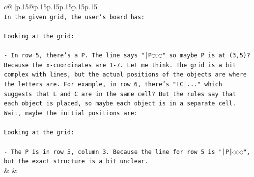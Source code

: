 \documentclass{article}
\begin{document}
{\begin{supertabular}{c@{$\;$}|p{.15\linewidth}@{}p{.15\linewidth}p{.15\linewidth}p{.15\linewidth}p{.15\linewidth}p{.15\linewidth}}
{{{\\ 
\texttt{In the given grid, the user's board has:} \\
\\ 
\texttt{Looking at the grid:} \\
\\ 
\texttt{{-} In row 5, there's a P. The line says "│P◌◌◌" so maybe P is at (3,5)? Because the x{-}coordinates are 1{-}7. Let me think. The grid is a bit complex with lines, but the actual positions of the objects are where the letters are. For example, in row 6, there's "LC│..." which suggests that L and C are in the same cell? But the rules say that each object is placed, so maybe each object is in a separate cell. Wait, maybe the initial positions are:} \\
\\ 
\texttt{Looking at the grid:} \\
\\ 
\texttt{{-} The P is in row 5, column 3. Because the line for row 5 is "│P│◌◌◌", but the exact structure is a bit unclear.} \\
            }
        }
    }
    & & \\ \\


\end{supertabular}}
\end{document}
